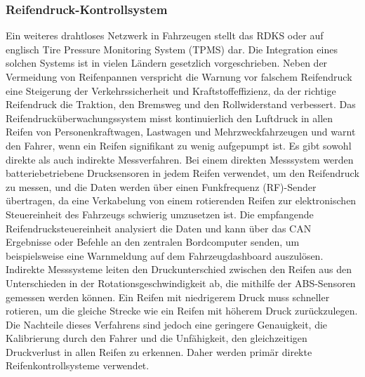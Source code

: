 \subsubsection{Reifendruck-Kontrollsystem}
Ein weiteres drahtloses Netzwerk in Fahrzeugen stellt das \ac{RDKS} oder auf englisch Tire Pressure Monitoring System (TPMS) dar. Die Integration eines solchen Systems ist in vielen Ländern gesetzlich vorgeschrieben. Neben der Vermeidung von Reifenpannen verspricht die Warnung vor falschem Reifendruck eine Steigerung der Verkehrssicherheit und Kraftstoffeffizienz, da der richtige Reifendruck die Traktion, den Bremsweg und den Rollwiderstand verbessert. Das Reifendrucküberwachungssystem misst kontinuierlich den Luftdruck in allen Reifen von Personenkraftwagen, Lastwagen und Mehrzweckfahrzeugen und warnt den Fahrer, wenn ein Reifen signifikant zu wenig aufgepumpt ist. Es gibt sowohl direkte als auch indirekte Messverfahren. Bei einem direkten Messsystem werden batteriebetriebene Drucksensoren in jedem Reifen verwendet, um den Reifendruck zu messen, und die Daten werden über einen Funkfrequenz (RF)-Sender übertragen, da eine Verkabelung von einem rotierenden Reifen zur elektronischen Steuereinheit des Fahrzeugs schwierig umzusetzen ist. Die empfangende Reifendrucksteuereinheit analysiert die Daten und kann über das \ac{CAN} Ergebnisse oder Befehle an den zentralen Bordcomputer senden, um beispielsweise eine Warnmeldung auf dem Fahrzeugdashboard auszulösen. Indirekte Messsysteme leiten den Druckunterschied zwischen den Reifen aus den Unterschieden in der Rotationsgeschwindigkeit ab, die mithilfe der \ac{ABS}-Sensoren gemessen werden können. Ein Reifen mit niedrigerem Druck muss schneller rotieren, um die gleiche Strecke wie ein Reifen mit höherem Druck zurückzulegen. Die Nachteile dieses Verfahrens sind jedoch eine geringere Genauigkeit, die Kalibrierung durch den Fahrer und die Unfähigkeit, den gleichzeitigen Druckverlust in allen Reifen zu erkennen. Daher werden primär direkte Reifenkontrollsysteme verwendet. \cite[1]{Rouf.2010}

